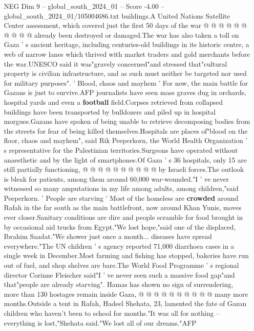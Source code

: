 \begin{textsample}{NEG Dim 9 – global\_south\_2024\_01 – Score -4.00 – global\_south\_2024\_01/105004686.txt}
buildings.A United Nations Satellite Center assessment, which covered just the first 50 days of the war @ @ @ @ @ @ @ @ @ @ already been destroyed or damaged.The war has also taken a toll on Gaza ' s ancient heritage, including centuries-old buildings in its historic centre, a web of narrow lanes which thrived with market traders and gold merchants before the war.UNESCO said it was"gravely concerned"and stressed that"cultural property is civilian infrastructure, and as such must neither be targeted nor used for military purposes". ' Blood, chaos and mayhem ' For now, the main battle for Gazans is just to survive.AFP journalists have seen mass graves dug in orchards, hospital yards and even a \textbf{football} field.Corpses retrieved from collapsed buildings have been transported by bulldozers and piled up in hospital morgues.Gazans have spoken of being unable to retrieve decomposing bodies from the streets for fear of being killed themselves.Hospitals are places of"blood on the floor, chaos and mayhem", said Rik Peeperkorn, the World Health Organization ' s representative for the Palestinian territories.Surgeons have operated without anaesthetic and by the light of smartphones.Of Gaza ' s 36 hospitals, only 15 are still partially functioning, @ @ @ @ @ @ @ @ @ @ by Israeli forces.The outlook is bleak for patients, among them around 60,000 war-wounded."I ' ve never witnessed so many amputations in my life among adults, among children,"said Peeperkorn. ' People are starving ' Most of the homeless are \textbf{crowded} around Rafah in the far south as the main battlefront, now around Khan Yunis, moves ever closer.Sanitary conditions are dire and people scramble for food brought in by occasional aid trucks from Egypt."We lost hope,"said one of the displaced, Ibrahim Saadat."We shower just once a month... diseases have spread everywhere."The UN children ' s agency reported 71,000 diarrhoea cases in a single week in December.Most farming and fishing has stopped, bakeries have run out of fuel, and shop shelves are bare.The World Food Programme ' s regional director Corinne Fleischer said"I ' ve never seen such a massive food gap"and that"people are already starving".
Hamas has shown no sign of surrendering, more than 130 hostages remain inside Gaza, @ @ @ @ @ @ @ @ @ @ many more months.Outside a tent in Rafah, Hadeel Shehata, 23, lamented the fate of Gazan children who haven't been to school for months."It was all for nothing -- everything is lost,"Shehata said."We lost all of our dreams."AFP

\end{textsample}
